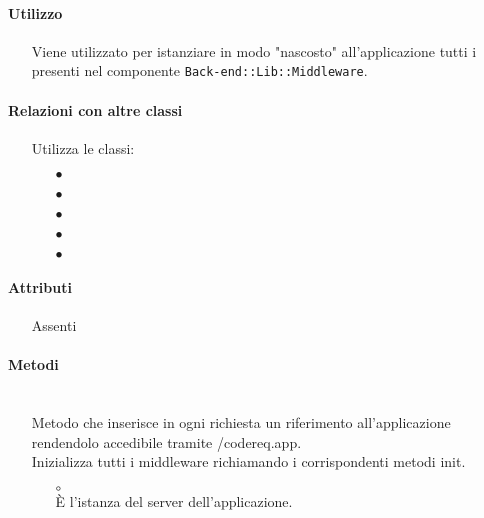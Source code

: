 \paragraph*{Utilizzo}
\begin{itemize}
\item[] Viene utilizzato per istanziare in modo "nascosto" all'applicazione tutti i  presenti nel componente \texttt{Back-end::Lib::Middleware}.
\end{itemize}

\paragraph*{Relazioni con altre classi}
\begin{itemize}


\item[] Utilizza le classi:
\begin{itemize}
\item[$\bullet$] 
\item[$\bullet$] 
\item[$\bullet$] 
\item[$\bullet$] 
\item[$\bullet$] 
\end{itemize}
\end{itemize}

\paragraph*{Attributi}
\begin{itemize}
\item[] Assenti
\end{itemize}

\paragraph*{Metodi}
\begin{itemize}
\item[]  \\ Metodo che inserisce in ogni richiesta un riferimento all'applicazione rendendolo accedibile  tramite /code{req.app}. \\
Inizializza tutti i middleware richiamando i corrispondenti metodi init.
\begin{itemize}\addtolength{\itemsep}{-0.5\baselineskip}
\item[$\circ$]  \\ È l'istanza del server dell'applicazione.
\end{itemize}
\end{itemize}


